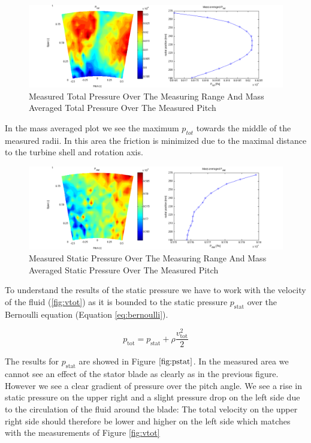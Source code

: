 \begin{figure}[H]
\centering
\includegraphics[trim = 110px 0px 80px 0px, clip = true,width=\textwidth]{pics/ptot.png}
\caption{Measured Total Pressure Over The Measuring Range And Mass Averaged Total Pressure Over The Measured Pitch}
\label{fig:ptot}
\end{figure}

In the mass averaged plot we see the maximum $p_{tot}$ towards the middle of the measured radii. In this area the friction is minimized due to the maximal distance to the turbine shell and rotation axis. 

\begin{figure}[H]
\centering
\includegraphics[trim = 110px 0px 80px 0px, clip = true,width=\textwidth]{pics/pstat.png}
\caption{Measured Static Pressure Over The Measuring Range And Mass Averaged Static Pressure Over The Measured Pitch}
\label{fig:pstat}
\end{figure}

To understand the results of the static pressure we have to work with the velocity of the fluid (\ref{fig:vtot}) as it is bounded to the static pressure $p_\text{stat}$ over the Bernoulli equation (Equation \ref{eq:bernoulli}). 

\begin{equation}
p_\text{tot} = p_\text{stat} + \rho \frac{v_\text{tot}^2}{2}
\label{eq:bernoulli}
\end{equation}
  
The results for $p_\text{stat}$ are showed in Figure $\ref{fig:pstat}$. In the measured area we cannot see an effect of the stator blade as clearly as in the previous figure. However we see a clear gradient of pressure over the pitch angle. We see a rise in static pressure on the upper right and a slight pressure drop on the left side due to the circulation of the fluid around the blade: The total velocity on the upper right side should therefore be lower and higher on the left side which matches with the measurements of Figure \ref{fig:vtot}

